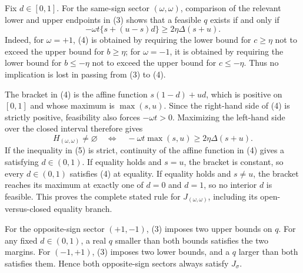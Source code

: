 Fix \(d\in[0,1]\). For the same-sign sector \((\omega,\omega)\), comparison of the relevant lower and upper endpoints in (3) shows that a feasible \(q\) exists if and only if
\[
-\omega t\{s+(u-s)d\}\ge2\eta\Delta(s+u). \tag{4}
\]
Indeed, for \(\omega=+1\), (4) is obtained by requiring the lower bound for \(c\ge\eta\) not to exceed the upper bound for \(b\ge\eta\); for \(\omega=-1\), it is obtained by requiring the lower bound for \(b\le-\eta\) not to exceed the upper bound for \(c\le-\eta\). Thus no implication is lost in passing from (3) to (4).

The bracket in (4) is the affine function \(s(1-d)+ud\), which is positive on \([0,1]\) and whose maximum is \(\max(s,u)\). Since the right-hand side of (4) is strictly positive, feasibility also forces \(-\omega t>0\). Maximizing the left-hand side over the closed interval therefore gives
\[
H_{(\omega,\omega)}\ne\varnothing
\quad\Longleftrightarrow\quad
-\omega t\max(s,u)\ge2\eta\Delta(s+u). \tag{5}
\]
If the inequality in (5) is strict, continuity of the affine function in (4) gives a satisfying \(d\in(0,1)\). If equality holds and \(s=u\), the bracket is constant, so every \(d\in(0,1)\) satisfies (4) at equality. If equality holds and \(s\ne u\), the bracket reaches its maximum at exactly one of \(d=0\) and \(d=1\), so no interior \(d\) is feasible. This proves the complete stated rule for \(J_{(\omega,\omega)}\), including its open-versus-closed equality branch.

For the opposite-sign sector \((+1,-1)\), (3) imposes two upper bounds on \(q\). For any fixed \(d\in(0,1)\), a real \(q\) smaller than both bounds satisfies the two margins. For \((-1,+1)\), (3) imposes two lower bounds, and a \(q\) larger than both satisfies them. Hence both opposite-sign sectors always satisfy \(J_{\sigma}\).

